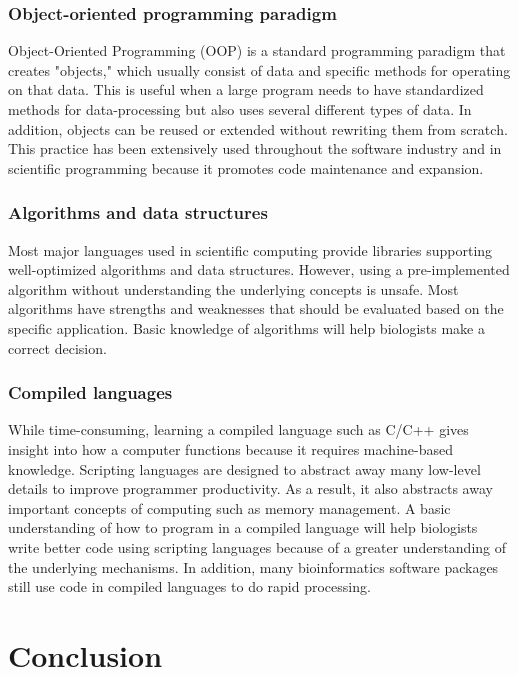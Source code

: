 \documentclass[ChapterTOCs,krantz2]{krantz} %
\begin{document}
\subsubsection{Object-oriented programming paradigm}

Object-Oriented Programming (OOP) is a standard programming paradigm that
creates "objects," which usually consist of data 
and specific methods for operating on that data. This is useful when a large program 
needs to have standardized methods for data-processing but also uses 
several different types of data.
In addition, objects can be reused or extended without rewriting them from scratch.
This practice has been extensively used throughout the software industry and 
in scientific programming because it promotes code maintenance and expansion.

\subsubsection{Algorithms and data structures}

Most major languages used in
scientific computing provide libraries supporting well-optimized algorithms and
data structures. However, using a
pre-implemented algorithm without understanding the underlying concepts is
unsafe. Most algorithms have strengths and weaknesses that should be 
evaluated based on the specific application. Basic knowledge of algorithms 
will help biologists make a correct decision.

\subsubsection{Compiled languages}

While time-consuming, learning a compiled language such as C/C++
gives insight into how a computer functions because it requires 
machine-based knowledge. Scripting languages are designed to abstract 
away many low-level
details to improve programmer productivity. As a result, it also abstracts away
important concepts of computing such as memory management. A basic
understanding of how to program in a compiled language will help biologists
write better code using scripting languages because of a greater understanding
of the underlying mechanisms. In addition, many bioinformatics software
packages still use code in compiled languages to do rapid
processing.  

\section{Conclusion}\label{conclusion}
\end{document}
